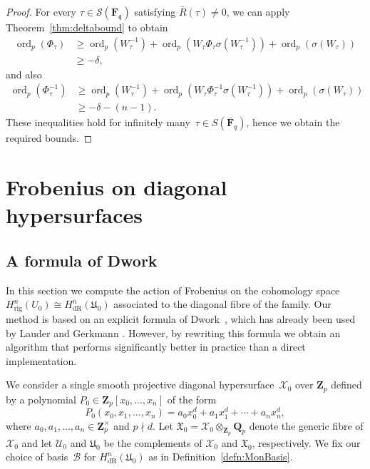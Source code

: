 \documentclass[a4paper,11pt]{article}
\numberwithin{equation}{section}
\newcommand{\ZZ}{\mathbf{Z}} %
\newcommand{\QQ}{\mathbf{Q}} %
\newcommand{\FF}{\mathbf{F}} %
\DeclareMathOperator{\ord}{ord}          %
\providecommand{\HdR}{H_{\text{dR}}}    %
\providecommand{\Hrig}{H_{\text{rig}}}  %
\providecommand{\cB}{\mathcal{B}} %
\theoremstyle{definition}
\begin{document}
\begin{proof}
For every $\tau \in \mathcal{S}(\FF_{\mathfrak{q}})$ satisfying 
$\bar{R}(\tau) \neq 0$, we can apply Theorem~\ref{thm:deltabound} 
to obtain
\begin{align*}
\ord_p(\Phi_{\tau}) &\geq \ord_p(W^{-1}_{\tau}) + 
                          \ord_p(W_{\tau} \Phi_{\tau} \sigma(W_{\tau}^{-1})) + 
                          \ord_p(\sigma(W_{\tau})) \\
                    &\geq -\delta,
\end{align*}
and also
\begin{align*}
\ord_p(\Phi^{-1}_{\tau}) &\geq \ord_p(W^{-1}_{\tau}) + 
                               \ord_p(W_{\tau} \Phi^{-1}_{\tau} \sigma(W_{\tau}^{-1})) + 
                               \ord_p(\sigma(W_{\tau})) \\
                         &\geq -\delta - (n-1).
\end{align*}
These inequalities hold for infinitely many~$\tau \in S(\bar{\FF}_q)$, 
hence we obtain the required bounds.
\end{proof}


\section{Frobenius on diagonal hypersurfaces}
\label{sec:Diagonal}

\subsection{A formula of Dwork}

In this section we compute the action of Frobenius on the cohomology 
space $\Hrig^{n}(U_0) \cong \HdR^{n}(\mathfrak{U}_0)$ associated 
to the diagonal fibre of the family. Our method is based on an 
explicit formula of Dwork~\citep[\S 4]{Dwork1964}, which has already 
been used by Lauder \citep{Lauder2004b} and Gerkmann 
\citep{Gerkmann2007}. However, by rewriting this formula we obtain an 
algorithm that performs significantly better in practice than a direct 
implementation.

We consider a single smooth 
projective diagonal hypersurface~$\mathcal{X}_0$ over $\ZZ_p$ defined by 
a polynomial $P_0 \in \ZZ_p[x_0, \dotsc, x_n]$ of the form
\begin{equation*}
P_0(x_0, x_1, \dotsc, x_n) = 
    a_0 x_0^d + a_1 x_1^d + \dotsb + a_n x_n^d,
\end{equation*}
where $a_0, a_1, \dotsc, a_n \in \ZZ_p^{\times}$ and $p \nmid d$. 
Let $\mathfrak{X}_0 = \mathcal{X}_0 \otimes_{\ZZ_p} \QQ_p$ denote the generic 
fibre of $\mathcal{X}_0$ and let $\mathcal{U}_0$ and $\mathfrak{U}_0$ be the 
complements of $\mathcal{X}_0$ and $\mathfrak{X}_0$, respectively. 
We fix our choice of basis~$\cB$ for $\HdR^{n}(\mathfrak{U}_0)$ 
as in Definition~\ref{defn:MonBasis}. 
\end{document}
